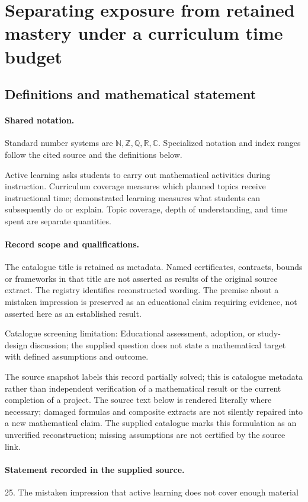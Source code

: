\documentclass[11pt]{article}
\begin{document}
\section{Separating exposure from retained mastery under a curriculum time budget}\label{statement}

\subsection{Definitions and mathematical statement}

\paragraph{Shared notation.}Standard number systems are $\mathbb N,\mathbb Z,\mathbb Q,\mathbb R,\mathbb C$. Specialized notation and index ranges follow the cited source and the definitions below.


Active learning asks students to carry out mathematical activities during instruction. Curriculum coverage measures which planned topics receive instructional time; demonstrated learning measures what students can subsequently do or explain. Topic coverage, depth of understanding, and time spent are separate quantities.
\paragraph{Record scope and qualifications.}
The catalogue title is retained as metadata. Named certificates, contracts, bounds or frameworks in that title are not asserted as results of the original source extract.
The registry identifies reconstructed wording. The premise about a mistaken impression is preserved as an educational claim requiring evidence, not asserted here as an established result.

Catalogue screening limitation: Educational assessment, adoption, or study-design discussion; the supplied question does not state a mathematical target with defined assumptions and outcome.

The source snapshot labels this record partially solved; this is catalogue metadata rather than independent verification of a mathematical result or the current completion of a project.
The source text below is rendered literally where necessary; damaged formulas and composite extracts are not silently repaired into a new mathematical claim.
The supplied catalogue marks this formulation as an unverified reconstruction; missing assumptions are not certified by the source link.
\paragraph{Statement recorded in the supplied source.}
25. The mistaken impression that active learning does not cover enough material
\end{document}

